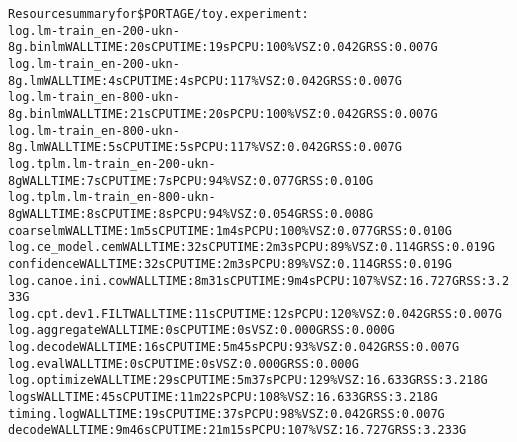 \documentclass[11pt,letterpaper]{article}
\begin{document}
\begin{tiny}
\begin{alltt}
Resource summary for \$PORTAGE/toy.experiment:
         log.lm-train_en-200-ukn-8g.binlm                 WALL TIME: 20s      CPU TIME: 19s       PCPU: 100\%   VSZ: 0.042G    RSS: 0.007G
         log.lm-train_en-200-ukn-8g.lm                    WALL TIME: 4s       CPU TIME: 4s        PCPU: 117\%   VSZ: 0.042G    RSS: 0.007G
         log.lm-train_en-800-ukn-8g.binlm                 WALL TIME: 21s      CPU TIME: 20s       PCPU: 100\%   VSZ: 0.042G    RSS: 0.007G
         log.lm-train_en-800-ukn-8g.lm                    WALL TIME: 5s       CPU TIME: 5s        PCPU: 117\%   VSZ: 0.042G    RSS: 0.007G
         log.tplm.lm-train_en-200-ukn-8g                  WALL TIME: 7s       CPU TIME: 7s        PCPU: 94\%    VSZ: 0.077G    RSS: 0.010G
         log.tplm.lm-train_en-800-ukn-8g                  WALL TIME: 8s       CPU TIME: 8s        PCPU: 94\%    VSZ: 0.054G    RSS: 0.008G
      coarselm                                            WALL TIME: 1m5s     CPU TIME: 1m4s      PCPU: 100\%   VSZ: 0.077G    RSS: 0.010G
         log.ce_model.cem                                 WALL TIME: 32s      CPU TIME: 2m3s      PCPU: 89\%    VSZ: 0.114G    RSS: 0.019G
      confidence                                          WALL TIME: 32s      CPU TIME: 2m3s      PCPU: 89\%    VSZ: 0.114G    RSS: 0.019G
         log.canoe.ini.cow                                WALL TIME: 8m31s    CPU TIME: 9m4s      PCPU: 107\%   VSZ: 16.727G   RSS: 3.233G
         log.cpt.dev1.FILT                                WALL TIME: 11s      CPU TIME: 12s       PCPU: 120\%   VSZ: 0.042G    RSS: 0.007G
            log.aggregate                                 WALL TIME: 0s       CPU TIME: 0s                     VSZ: 0.000G    RSS: 0.000G
            log.decode                                    WALL TIME: 16s      CPU TIME: 5m45s     PCPU: 93\%    VSZ: 0.042G    RSS: 0.007G
            log.eval                                      WALL TIME: 0s       CPU TIME: 0s                     VSZ: 0.000G    RSS: 0.000G
            log.optimize                                  WALL TIME: 29s      CPU TIME: 5m37s     PCPU: 129\%   VSZ: 16.633G   RSS: 3.218G
         logs                                             WALL TIME: 45s      CPU TIME: 11m22s    PCPU: 108\%   VSZ: 16.633G   RSS: 3.218G
         timing.log                                       WALL TIME: 19s      CPU TIME: 37s       PCPU: 98\%    VSZ: 0.042G    RSS: 0.007G
      decode                                              WALL TIME: 9m46s    CPU TIME: 21m15s    PCPU: 107\%   VSZ: 16.727G   RSS: 3.233G

\end{alltt}
\end{tiny}
\end{document}
